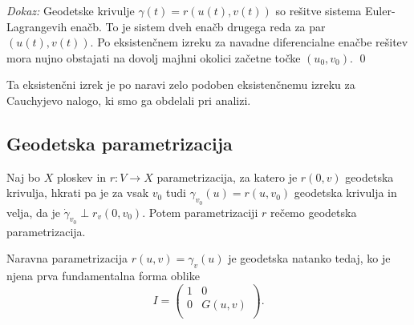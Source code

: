 \noindent
{\em Dokaz:\/}
Geodetske krivulje $\gamma(t) = r(u(t), v(t))$ so rešitve sistema Euler-Lagrangevih enačb. To je sistem dveh enačb drugega reda za par $(u(t), v(t))$. Po 
eksistenčnem izreku za navadne diferencialne enačbe rešitev mora nujno obstajati na dovolj majhni okolici začetne točke $(u_0, v_0)$.
\qed

\begin{opomba}
Ta eksistenčni izrek je po naravi zelo podoben eksistenčnemu izreku za Cauchyjevo nalogo, ki smo ga obdelali pri analizi.
\end{opomba}

\subsection{Geodetska parametrizacija}

\begin{definicija}
\label{def_geodetska_parametrizacija}

Naj bo $X$ ploskev in $r: V \to  X$ parametrizacija, za katero je $r(0, v)$ geodetska krivulja, hkrati pa je za vsak
$v_0$ tudi $\gamma_{v_0}(u) = r(u, v_0)$ geodetska krivulja in velja, da je $\dot{\gamma}_{v_0} \perp r_v(0, v_0)$.
Potem parametrizaciji $r$ rečemo geodetska parametrizacija.  

\end{definicija}

\begin{trditev}
\label{trd_ekvivalentni_pogoj_za_geodetskost_parametrizacije}
Naravna parametrizacija $r(u,v) = \gamma_v(u)$ je geodetska natanko tedaj, ko je njena prva fundamentalna forma oblike \begin{equation*}
I = \begin{pmatrix}
    1 & 0\\
    0 & G(u,v)\\
\end{pmatrix}.
\end{equation*}  
\end{trditev}

